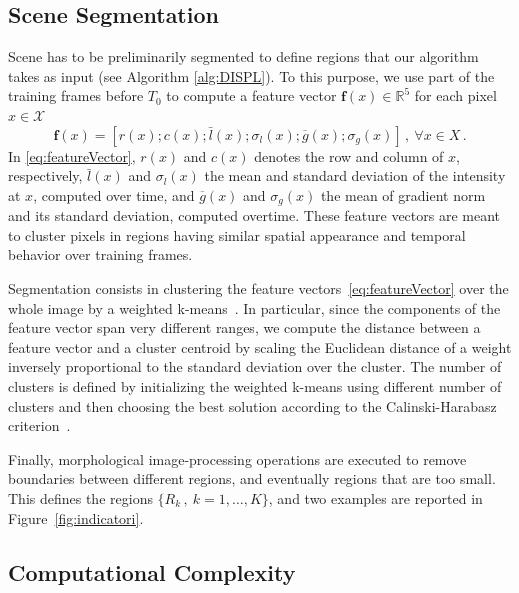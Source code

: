 \documentclass{llncs}
\newcommand{\gi}[1]{{\textcolor{red}{[\small \textbf{Giacomo}: #1]}}}
\begin{document}
\subsection{Scene Segmentation}\label{subsec:Segmentation}
Scene has to be preliminarily segmented to define regions that our algorithm takes as input (see Algorithm \ref{alg:DISPL}). To this purpose, we use part of the training frames before $T_0$ to compute a feature vector $\textbf{f}(x)\in \mathbb{R}^5$ for each pixel $x\in\mathcal{X}$ 
\begin{equation}
\label{eq:featureVector}
\textbf{f}(x)=\left[r(x);c(x);\bar{l}(x);\sigma_{l}(x);\overline{g}(x);\sigma_{g}(x)\right]\,, \ \forall x \in X\,.
\end{equation}
In \eqref{eq:featureVector}, $r(x)$ and $c(x)$ denotes the row and column of $x$, respectively, $\bar{l}(x)$ and $\sigma_{l}(x)$ the mean and standard deviation of the intensity at $x$, computed over time, and $\overline{g}(x)$ and $\sigma_g(x)$ the mean of gradient norm and its standard deviation, computed overtime. These feature vectors are meant to cluster pixels in regions having similar spatial appearance and temporal behavior over training frames.

Segmentation consists in clustering the feature vectors~\eqref{eq:featureVector} over the whole image by a weighted k-means~\cite{kottke1994motion}. In particular, since the components of the feature vector span very different ranges, we compute the distance between a feature vector and a cluster centroid by scaling the Euclidean distance of a weight inversely proportional to the standard deviation over the cluster. %
The number of clusters is defined by initializing the weighted k-means using different number of clusters and then choosing the best solution according to the Calinski-Harabasz criterion~\cite{calinski1974dendrite}.

Finally, morphological image-processing operations are executed to remove boundaries between different regions, and eventually regions that are too small. This defines the regions $\{R_k\,, \ k=1,\dots,K\}$, and two examples are reported in Figure~\ref{fig:indicatori}.

\subsection{Computational Complexity}\label{subsec:coputationalComplexity}
\end{document}
